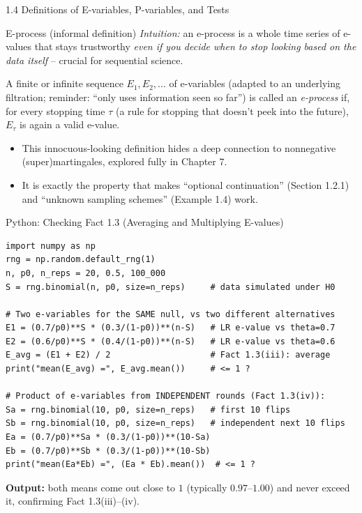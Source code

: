 \documentclass[aspectratio=169,10pt]{beamer}
\begin{document}
\begin{frame}[allowframebreaks]{1.4 Definitions of E-variables, P-variables, and Tests}
\framebreak

\begin{block}{E-process (informal definition)}
\emph{Intuition:} an e-process is a whole time series of e-values that
stays trustworthy \emph{even if you decide when to stop looking based on
the data itself} -- crucial for sequential science.

A finite or infinite sequence $E_1, E_2, \dots$ of e-variables (adapted to
an underlying filtration; reminder: ``only uses information seen so far'')
is called an \emph{e-process} if, for every stopping time $\tau$ (a rule
for stopping that doesn't peek into the future), $E_\tau$ is again a valid
e-value.
\begin{itemize}
  \item This innocuous-looking definition hides a deep connection to
    nonnegative (super)martingales, explored fully in Chapter 7.
  \item It is exactly the property that makes ``optional continuation''
    (Section 1.2.1) and ``unknown sampling schemes'' (Example 1.4) work.
\end{itemize}
\end{block}

\end{frame}

\begin{frame}[fragile]{Python: Checking Fact 1.3 (Averaging and Multiplying E-values)}

\begin{lstlisting}
import numpy as np
rng = np.random.default_rng(1)
n, p0, n_reps = 20, 0.5, 100_000
S = rng.binomial(n, p0, size=n_reps)     # data simulated under H0

# Two e-variables for the SAME null, vs two different alternatives
E1 = (0.7/p0)**S * (0.3/(1-p0))**(n-S)   # LR e-value vs theta=0.7
E2 = (0.6/p0)**S * (0.4/(1-p0))**(n-S)   # LR e-value vs theta=0.6
E_avg = (E1 + E2) / 2                    # Fact 1.3(iii): average
print("mean(E_avg) =", E_avg.mean())     # <= 1 ?

# Product of e-variables from INDEPENDENT rounds (Fact 1.3(iv)):
Sa = rng.binomial(10, p0, size=n_reps)   # first 10 flips
Sb = rng.binomial(10, p0, size=n_reps)   # independent next 10 flips
Ea = (0.7/p0)**Sa * (0.3/(1-p0))**(10-Sa)
Eb = (0.7/p0)**Sb * (0.3/(1-p0))**(10-Sb)
print("mean(Ea*Eb) =", (Ea * Eb).mean())  # <= 1 ?
\end{lstlisting}

\medskip
\textbf{Output:} both means come out close to $1$ (typically
$0.97$--$1.00$) and never exceed it, confirming Fact 1.3(iii)--(iv).

\end{frame}
\end{document}
